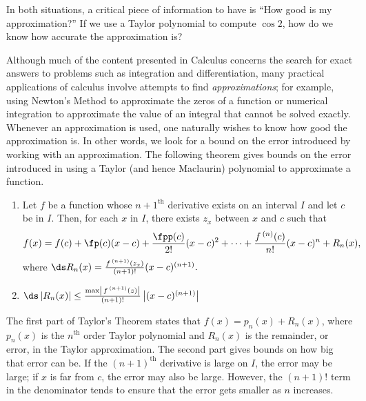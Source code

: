 	
In both situations, a critical piece of information to have is ``How good is my approximation?'' If we use a Taylor polynomial to compute $\cos 2$, how do we know how accurate the approximation is? 

Although much of the content presented in Calculus concerns the search for exact answers to problems such as integration and differentiation, many practical applications of calculus involve attempts to find \textit{approximations}; for example, using Newton's Method to approximate the zeros of a function or numerical integration to approximate the value of an integral that cannot be solved exactly. Whenever an approximation is used, one naturally wishes to know how good the approximation is. In other words, we look for a bound on the error introduced by working with an approximation. The following theorem gives bounds on the error introduced in using a Taylor (and hence Maclaurin) polynomial to approximate a function.

\setboxwidth{65pt}
\noindent\ifthenelse{\isodd{\thepage}}{}{\hskip-65pt}
\noindent\begin{minipage}[t]{\specialboxlength}
{\begin{enumerate}
\item	Let $f$ be a function whose $n+1^\text{th}$ derivative exists on an interval $I$ and let $c$ be in $I$. Then, for each $x$ in $I$, there exists $z_x$ between $x$ and $c$ such that
\[
f(x) = f(c) + \fp(c)(x-c) + \frac{\fpp(c)}{2!}(x-c)^2+ \cdots +\frac{f\,^{(n)}(c)}{n!}(x-c)^n+R_n(x),
\]
where $\ds R_n(x) = \frac{f\,^{(n+1)}(z_x)}{(n+1)!}(x-c)^{(n+1)}.$

\item		$\ds \left\lvert R_n(x)\right\rvert \leq \frac{\max\left\lvert \,f\,^{(n+1)}(z)\right\rvert}{(n+1)!}\left\lvert(x-c)^{(n+1)}\right\rvert$
\end{enumerate}
}
\end{minipage}
\restoreboxwidth

The first part of Taylor's Theorem states that $f(x) = p_n(x) + R_n(x)$, where $p_n(x)$ is the $n^\text{th}$ order Taylor polynomial and $R_n(x)$ is the remainder, or error, in the Taylor approximation. The second part gives bounds on how big that error can be. If the $(n+1)^\text{th}$ derivative is large on $I$, the error may be large; if $x$ is far from $c$, the error may also be large. However, the $(n+1)!$ term in the denominator tends to ensure that the error gets smaller as $n$ increases.

